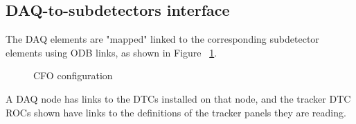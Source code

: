 \subsection{DAQ-to-subdetectors interface}
The DAQ elements are "mapped" linked to the corresponding subdetector elements using ODB links,
as shown in Figure ~\ref{figure:daq_to_tracker_interface}.
\begin{figure}[H]
  \caption{
    \label{figure:daq_to_tracker_interface}
    CFO configuration
  }
\end{figure}

A DAQ node has links to the DTCs installed on that node, and the tracker DTC ROCs shown have
links to the definitions of the tracker panels they are reading.

